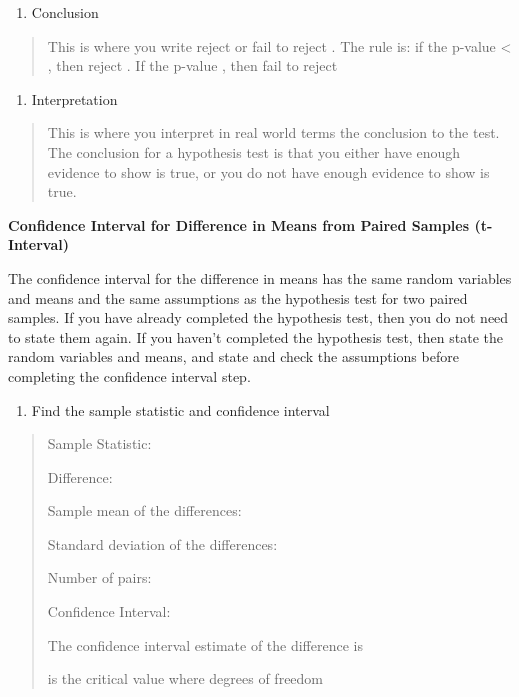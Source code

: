 \documentclass[]{book}
\providecommand{\tightlist}{%
  \setlength{\itemsep}{0pt}\setlength{\parskip}{0pt}}
\begin{document}
\begin{enumerate}
\def\labelenumi{\arabic{enumi}.}
\setcounter{enumi}{4}
\tightlist
\item
  Conclusion
\end{enumerate}

\begin{quote}
This is where you write reject or fail to reject . The rule is: if the p-value \textless{} , then reject . If the p-value , then fail to reject
\end{quote}

\begin{enumerate}
\def\labelenumi{\arabic{enumi}.}
\setcounter{enumi}{5}
\tightlist
\item
  Interpretation
\end{enumerate}

\begin{quote}
This is where you interpret in real world terms the conclusion to the test. The conclusion for a hypothesis test is that you either have enough evidence to show is true, or you do not have enough evidence to show is true.
\end{quote}

\textbf{Confidence Interval for Difference in Means from Paired Samples
(t-Interval)}

The confidence interval for the difference in means has the same random variables and means and the same assumptions as the hypothesis test for two paired samples. If you have already completed the hypothesis test, then you do not need to state them again. If you haven't completed the hypothesis test, then state the random variables and means, and state and check the assumptions before completing the confidence interval step.

\begin{enumerate}
\def\labelenumi{\arabic{enumi}.}
\tightlist
\item
  Find the sample statistic and confidence interval
\end{enumerate}

\begin{quote}
Sample Statistic:

Difference:

Sample mean of the differences:

Standard deviation of the differences:

Number of pairs:

Confidence Interval:

The confidence interval estimate of the difference is

is the critical value where degrees of freedom
\end{quote}
\end{document}

